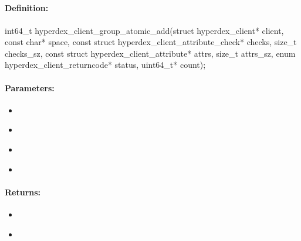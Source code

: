 \pagebreak
\subsection{}
\label{api:c:group_atomic_add}


\paragraph{Definition:}
\begin{ccode}
int64_t hyperdex_client_group_atomic_add(struct hyperdex_client* client,
        const char* space,
        const struct hyperdex_client_attribute_check* checks, size_t checks_sz,
        const struct hyperdex_client_attribute* attrs, size_t attrs_sz,
        enum hyperdex_client_returncode* status,
        uint64_t* count);
\end{ccode}

\paragraph{Parameters:}
\begin{itemize}[noitemsep]
\item {}\\

\item {}\\

\item {}\\

\item {}\\

\end{itemize}

\paragraph{Returns:}
\begin{itemize}[noitemsep]
\item {}\\

\item {}\\

\end{itemize}


